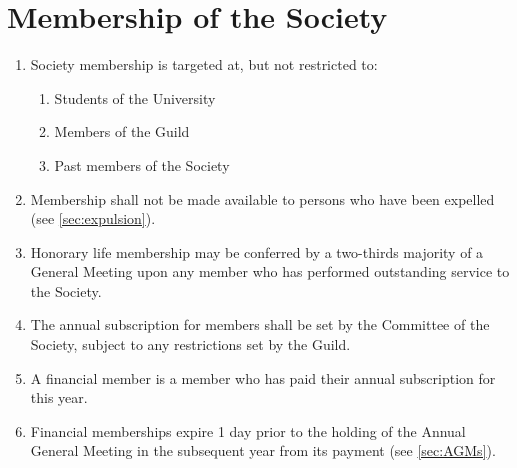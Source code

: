 \documentclass[a4paper]{article}
\begin{document}
\section{Membership of the Society}
\begin{enumerate}
    \item Society membership is targeted at, but not restricted to:
    \begin{enumerate}
        \item Students of the University
        \item Members of the Guild
        \item Past members of the Society
    \end{enumerate}
    \item Membership shall not be made available to persons who have been expelled (see \cref{sec:expulsion}).
    \item Honorary life membership may be conferred by a two-thirds majority of a General Meeting upon any member who has performed outstanding service to the Society.
    \item The annual subscription for members shall be set by the Committee of the Society, subject to any restrictions set by the Guild.
    \item A financial member is a member who has paid their annual subscription for this year.
    \item Financial memberships expire 1 day prior to the holding of the Annual General Meeting in the subsequent year from its payment (see \cref{sec:AGMs}).
\end{enumerate}
\end{document}
